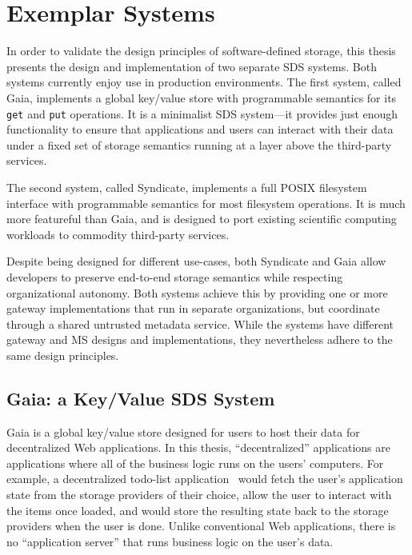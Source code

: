 \chapter{Exemplar Systems}
\label{chap:syndicate_sds}

In order to validate the design principles of software-defined storage, this 
thesis presents the design and implementation of two separate SDS systems.
Both systems currently enjoy use in production environments.
The first system, called Gaia, implements a global key/value store with programmable semantics for its
\texttt{get} and \texttt{put} operations.  It is a minimalist SDS system---it
provides just enough functionality to ensure that applications and
users can interact with their data under a fixed set of storage
semantics running at a layer above the third-party services.

The second system, called Syndicate, implements
a full POSIX filesystem interface with programmable semantics for most
filesystem operations.  It is much more featureful than Gaia, and is designed
to port existing scientific computing workloads to commodity third-party
services.

Despite being designed for different use-cases, both Syndicate and Gaia allow
developers to preserve end-to-end storage semantics while respecting
organizational autonomy.  Both systems achieve this by providing one or more
gateway implementations that run in separate organizations, but
coordinate through a shared untrusted metadata service.  While the systems have
different gateway and MS designs and implementations, they nevertheless adhere to
the same design principles.

\section{Gaia: a Key/Value SDS System}

Gaia is a global key/value store designed for users to host their data
for decentralized Web applications.  In this thesis, ``decentralized''
applications are applications where all of the business logic runs on the
users' computers.  For example, a decentralized todo-list
application~\cite{blockstack-todo} would fetch the user's application state from
the storage providers of their choice, allow the user to interact with the items
once loaded, and would store the resulting state back to the storage providers
when the user is done.  Unlike conventional Web applications,
there is no ``application server'' that runs business logic on the user's data.

